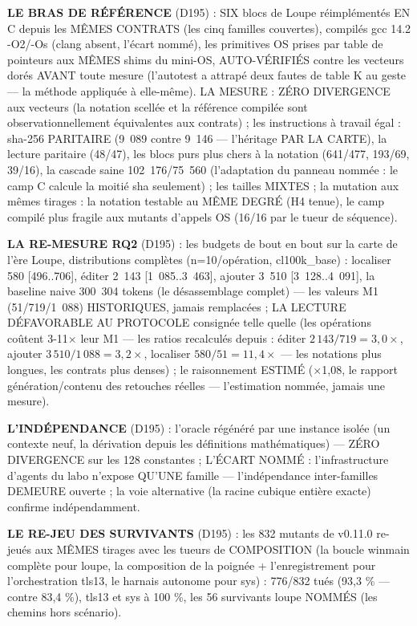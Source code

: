 \textbf{LE BRAS DE RÉFÉRENCE} (D195) : SIX blocs de Loupe réimplémentés
EN C depuis les MÊMES CONTRATS (les cinq familles couvertes), compilés
gcc 14.2 -O2/-Os (clang absent, l'écart nommé), les primitives OS prises
par table de pointeurs aux MÊMES shims du mini-OS, AUTO-VÉRIFIÉS contre
les vecteurs dorés AVANT toute mesure (l'autotest a attrapé deux fautes
de table K au geste — la méthode appliquée à elle-même). LA MESURE :
ZÉRO DIVERGENCE aux vecteurs (la notation scellée et la référence
compilée sont observationnellement équivalentes aux contrats) ; les
instructions à travail égal : sha-256 PARITAIRE (9~089 contre 9~146 —
l'héritage PAR LA CARTE), la lecture paritaire (48/47), les blocs purs
plus chers à la notation (641/477, 193/69, 39/16), la cascade saine
102~176/75~560 (l'adaptation du panneau nommée : le camp C calcule la
moitié sha seulement) ; les tailles MIXTES ; la mutation aux mêmes
tirages : la notation testable au MÊME DEGRÉ (H4 tenue), le camp compilé
plus fragile aux mutants d'appels OS (16/16 par le tueur de séquence).

\textbf{LA RE-MESURE RQ2} (D195) : les budgets de bout en bout sur la
carte de l'ère Loupe, distributions complètes (n=10/opération,
cl100k\_base) : localiser 580 [496..706], éditer 2~143 [1~085..3~463],
ajouter 3~510 [3~128..4~091], la baseline naive 300~304 tokens (le
désassemblage complet) — les valeurs M1 (51/719/1~088) HISTORIQUES,
jamais remplacées ; LA LECTURE DÉFAVORABLE AU PROTOCOLE consignée telle
quelle (les opérations coûtent 3-11$\times$ leur M1 — les ratios
recalculés depuis  : éditer $2\,143/719 =
3{,}0\times$, ajouter $3\,510/1\,088 = 3{,}2\times$, localiser
$580/51 = 11{,}4\times$ — les notations plus
longues, les contrats plus denses) ; le raisonnement ESTIMÉ
($\times$1,08, le rapport génération/contenu des retouches réelles —
l'estimation nommée, jamais une mesure).

\textbf{L'INDÉPENDANCE} (D195) : l'oracle régénéré par une instance
isolée (un contexte neuf, la dérivation depuis les définitions
mathématiques) — ZÉRO DIVERGENCE sur les 128 constantes ; L'ÉCART NOMMÉ :
l'infrastructure d'agents du labo n'expose QU'UNE famille — l'indépendance
inter-familles DEMEURE ouverte ; la voie alternative (la racine cubique
entière exacte) confirme indépendamment.

\textbf{LE RE-JEU DES SURVIVANTS} (D195) : les 832 mutants de v0.11.0
re-jeués aux MÊMES tirages avec les tueurs de COMPOSITION (la boucle
winmain complète pour loupe, la composition de la poignée +
l'enregistrement pour l'orchestration tls13, le harnais autonome pour
sys) : 776/832 tués (93,3 \% — contre 83,4 \%), tls13 et sys à
100 \%, les 56 survivants loupe NOMMÉS (les chemins hors scénario).

